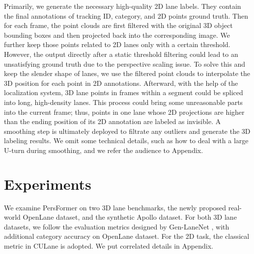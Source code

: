 \documentclass[runningheads]{llncs}
\begin{document}
Primarily, we generate the necessary high-quality 2D lane labels. 
They contain the final annotations of tracking ID, category, and 2D points ground truth.
Then for each frame, the point clouds are first filtered with the original 3D object bounding boxes and then projected back into the corresponding image. 
We further keep those points related to 2D lanes only with a certain threshold.
However, the output directly after a static threshold filtering could lead to an unsatisfying ground truth due to the perspective scaling issue.
To solve this and keep the slender shape of lanes, we use the filtered point clouds to interpolate the 3D position for each point in 2D annotations. 
Afterward, with the help of the localization system, 3D lane points in frames within a segment could be spliced into long, high-density lanes.
This process could bring some unreasonable parts into the current frame; thus, points in one lane whose 2D projections are higher than the ending position of its 2D annotation are labeled as invisible.
A smoothing step is ultimately deployed to filtrate any outliers and generate the 3D labeling results.
We omit some technical details, such as how to deal with a large U-turn during smoothing, and we refer the audience to Appendix.


 \section{Experiments}\label{sec: experiments}

We examine PersFormer on two 3D lane benchmarks, the newly proposed {real-world} OpenLane dataset, and the {synthetic} Apollo dataset. 
For both 3D lane datasets, we follow the evaluation metrics designed by Gen-LaneNet \cite{guo2020gen}, with additional category accuracy on OpenLane dataset.
For the 2D task, the classical metric in CULane \cite{pan2018spatial} is adopted.
We put correlated details in Appendix.
\end{document}
